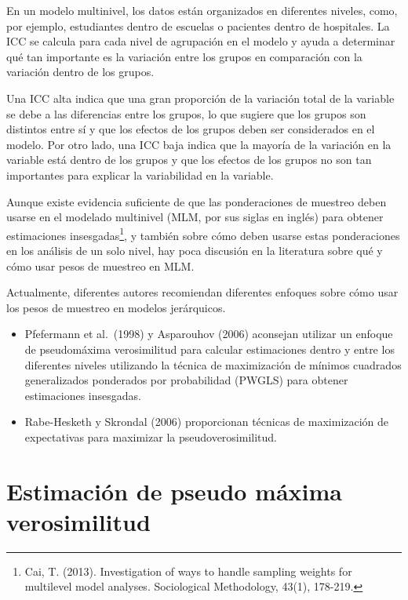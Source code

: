 \documentclass[
  12pt,
]{book}
\begin{document}
En un modelo multinivel, los datos están organizados en diferentes niveles, como, por ejemplo, estudiantes dentro de escuelas o pacientes dentro de hospitales. La ICC se calcula para cada nivel de agrupación en el modelo y ayuda a determinar qué tan importante es la variación entre los grupos en comparación con la variación dentro de los grupos.

Una ICC alta indica que una gran proporción de la variación total de la variable se debe a las diferencias entre los grupos, lo que sugiere que los grupos son distintos entre sí y que los efectos de los grupos deben ser considerados en el modelo. Por otro lado, una ICC baja indica que la mayoría de la variación en la variable está dentro de los grupos y que los efectos de los grupos no son tan importantes para explicar la variabilidad en la variable.

Aunque existe evidencia suficiente de que las ponderaciones de muestreo deben usarse en el modelado multinivel (MLM, por sus siglas en inglés) para obtener estimaciones insesgadas\footnote{Cai, T. (2013). Investigation of ways to handle sampling weights for multilevel model analyses. Sociological Methodology, 43(1), 178-219.}, y también sobre cómo deben usarse estas ponderaciones en los análisis de un solo nivel, hay poca discusión en la literatura sobre qué y cómo usar pesos de muestreo en MLM.

Actualmente, diferentes autores recomiendan diferentes enfoques sobre cómo usar los pesos de muestreo en modelos jerárquicos.

\begin{itemize}
\item
  Pfefermann et al.~(1998) y Asparouhov (2006) aconsejan utilizar un enfoque de pseudomáxima verosimilitud para calcular estimaciones dentro y entre los diferentes niveles utilizando la técnica de maximización de mínimos cuadrados generalizados ponderados por probabilidad (PWGLS) para obtener estimaciones insesgadas.
\item
  Rabe-Hesketh y Skrondal (2006) proporcionan técnicas de maximización de expectativas para maximizar la pseudoverosimilitud.
\end{itemize}

\hypertarget{estimaciuxf3n-de-pseudo-muxe1xima-verosimilitud}{%
\section{Estimación de pseudo máxima verosimilitud}\label{estimaciuxf3n-de-pseudo-muxe1xima-verosimilitud}}
\end{document}
